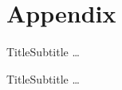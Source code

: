\appendix

\section{Appendix}


\begin{frame}{Title}{Subtitle}
    \dots    
\end{frame}
\note{
}


\begin{frame}{Title}{Subtitle}
    \dots    
\end{frame}
\note{
}


